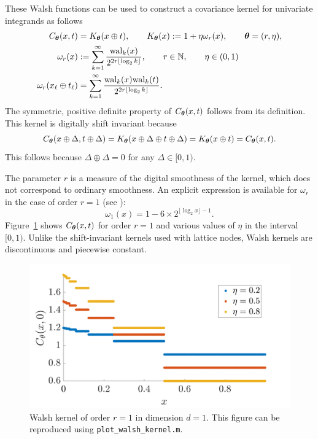 \documentclass[graybox,footinfo]{svmult}
\begin{document}
These Walsh functions can be used to construct a covariance kernel for univariate integrands as follows
\begin{align}
    \nonumber
    C_{\boldsymbol{\theta}} (x,t) & = K_{\boldsymbol{\theta}}(x \oplus t), \qquad K_{\boldsymbol{\theta}}(x) : = 1 + \eta \omega_{r} (x), \qquad {\boldsymbol{\theta}} = (r,\eta), \\
    \nonumber
    \omega_r(x) & := \sum_{k=1}^\infty \frac{\textup{wal}_{k}(x) }{2^{2r \lfloor \log_2 k \rfloor}}, \qquad r \in {{\mathbb{N}}}, \qquad \eta \in (0, 1)\\
    \nonumber
    \omega_{r} (x_\ell \oplus t_\ell) & = \sum_{k=1}^\infty \frac{\textup{wal}_{k}(x) \textup{wal}_{k}(t)  }{2^{2r \lfloor \log_2 k \rfloor}}.
\end{align}
The symmetric, positive definite property of $ C_{\boldsymbol{\theta}} (x,t)$ follows from its definition.  This kernel is digitally shift invariant because 
\[
C_{\boldsymbol{\theta}} (x \oplus \Delta ,t \oplus \Delta ) = K_{\boldsymbol{\theta}}(x \oplus \Delta \oplus t \oplus \Delta) = K_{\boldsymbol{\theta}}(x \oplus t) =  C_{\boldsymbol{\theta}} (x,t).
\]
This follows because $\Delta \oplus \Delta = 0$ for any $\Delta \in [0,1)$.

The parameter $r$ is a measure of the digital smoothness of the kernel, which does not correspond to ordinary smoothness.  An explicit expression is available for $\omega_{r}$ in the case of order $r=1$ (see \cite{Nuyens2013}):
\begin{equation}
\nonumber
\omega_1(x) 
= 1  - 6 \times 2^{\lfloor \log_2 x \rfloor -1 }.
\end{equation}
Figure~\ref{FJ:fig:walshkernel-dim1} shows $C_{\boldsymbol{\theta}} (x,t)$ for order $r=1$ and various values of $\eta$ in the interval $[0,1)$. Unlike the shift-invariant kernels used with lattice nodes, Walsh kernels are discontinuous and piecewise constant. 

\begin{figure}
	\centering
	\includegraphics[width=0.9\linewidth]{"figures/walsh_kernel_dim_1"}
	\caption[Walsh kernel]{Walsh kernel of order $r=1$ in dimension $d=1$. This figure can be reproduced using \texttt{plot\_walsh\_kernel.m}. 
	}
	\label{FJ:fig:walshkernel-dim1}
\end{figure}
\end{document}
